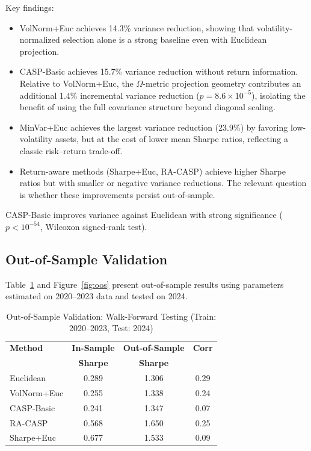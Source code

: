 \documentclass[10pt,twocolumn,a4paper]{article}
\begin{document}
Key findings:
\begin{itemize}
    \item VolNorm+Euc achieves 14.3\% variance reduction, showing that volatility-normalized selection alone is a strong baseline even with Euclidean projection.
    \item CASP-Basic achieves 15.7\% variance reduction without return information. Relative to VolNorm+Euc, the $\Omega$-metric projection geometry contributes an additional 1.4\% incremental variance reduction ($p=8.6\times 10^{-5}$), isolating the benefit of using the full covariance structure beyond diagonal scaling.
    \item MinVar+Euc achieves the largest variance reduction (23.9\%) by favoring low-volatility assets, but at the cost of lower mean Sharpe ratios, reflecting a classic risk--return trade-off.
    \item Return-aware methods (Sharpe+Euc, RA-CASP) achieve higher Sharpe ratios but with smaller or negative variance reductions. The relevant question is whether these improvements persist out-of-sample.
\end{itemize}

CASP-Basic improves variance against Euclidean with strong significance ($p < 10^{-54}$, Wilcoxon signed-rank test).

\subsection{Out-of-Sample Validation}

Table~\ref{tab:oos} and Figure~\ref{fig:oos} present out-of-sample results using parameters estimated on 2020--2023 data and tested on 2024.

\begin{table}[H]
\centering
\caption{Out-of-Sample Validation: Walk-Forward Testing (Train: 2020--2023, Test: 2024)}
\label{tab:oos}
\small
\begin{tabular}{lccc}
\toprule
\textbf{Method} & \textbf{In-Sample} & \textbf{Out-of-Sample} & \textbf{Corr} \\
 & \textbf{Sharpe} & \textbf{Sharpe} & \\
\midrule
Euclidean & 0.289 & 1.306 & 0.29 \\
VolNorm+Euc & 0.255 & 1.338 & 0.24 \\
CASP-Basic & 0.241 & 1.347 & 0.07 \\
RA-CASP & 0.568 & 1.650 & 0.25 \\
Sharpe+Euc & 0.677 & 1.533 & 0.09 \\
\bottomrule
\end{tabular}
\end{table}
\end{document}
